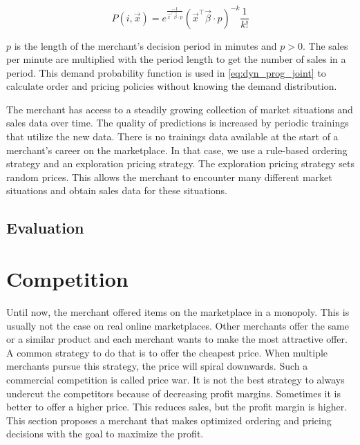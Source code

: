 \begin{equation}
\label{eq:probability}
P(i, \vec{x}) =
	e^{\frac{-1}{\vec{x}^\intercal \vec{\beta} \cdot p}}
	(\vec{x}^\intercal \vec{\beta} \cdot p)^{-k}
	\frac{1}
	{k!}
\end{equation}

$p$ is the length of the merchant's decision period in minutes and $p > 0$.
The sales per minute are multiplied with the period length to get the number of sales in a period.
This demand probability function is used in \cref{eq:dyn_prog_joint} to calculate order and pricing policies without knowing the demand distribution.

The merchant has access to a steadily growing collection of market situations and sales data over time.
The quality of predictions is increased by periodic trainings that utilize the new data.
There is no trainings data available at the start of a merchant's career on the marketplace.
In that case, we use a rule-based ordering strategy and an exploration pricing strategy.
The exploration pricing strategy sets random prices.
This allows the merchant to encounter many different market situations and obtain sales data for these situations.

\subsection{Evaluation}




\section{Competition}
Until now, the merchant offered items on the marketplace in a monopoly.
This is usually not the case on real online marketplaces.
Other merchants offer the same or a similar product and each merchant wants to make the most attractive offer.
A common strategy to do that is to offer the cheapest price.
When multiple merchants pursue this strategy, the price will spiral downwards.
Such a commercial competition is called price war.
It is not the best strategy to always undercut the competitors because of decreasing profit margins.
Sometimes it is better to offer a higher price.
This reduces sales, but the profit margin is higher.
This section proposes a merchant that makes optimized ordering and pricing decisions with the goal to maximize the profit.

